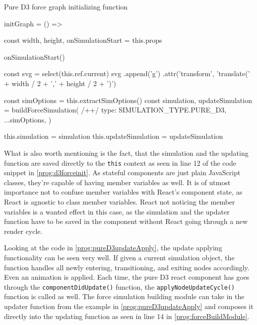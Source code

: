 \begin{program}[H]
\caption{Pure D3 force graph initializing function}
\label{prog:pureD3InitFn}
\begin{JsCode}
initGraph = () => {
  const { width, height, onSimulationStart } = this.props

  onSimulationStart()

  const svg = select(this.ref.current)
  svg
    .append('g')
    .attr('transform', 'translate(' + width / 2 + ',' + height / 2 + ')')

  const simOptions = this.extractSimOptions()
  const { simulation, updateSimulation } = buildForceSimulation({ /+\label{line:buildForceSimulation}+/
    type: SIMULATION_TYPE.PURE_D3,
    ...simOptions,
  })

  this.simulation = simulation
  this.updateSimulation = updateSimulation
}
\end{JsCode}
\end{program}

What is also worth mentioning is the fact, that the simulation and the updating function are saved directly to the \texttt{this} context as seen in line 12 of the code snippet in \ref{prog:d3forceinit}. As stateful components are just plain JavaScript classes, they're capable of having member variables as well. It is of utmost importance not to confuse member variables with React's component state, as React is agnostic to class member variables. React not noticing the member variables is a wanted effect in this case, as the simulation and the updater function have to be saved in the component without React going through a new render cycle. 

Looking at the code in \ref{prog:pureD3updateApply}, the update applying functionality can be seen very well. If given a current simulation object, the function handles all newly entering, transitioning, and exiting nodes accordingly. Even an animation is applied. Each time, the pure D3 react component has goes through the \texttt{componentDidUpdate()} function, the \texttt{applyNodeUpdateCycle()} function is called as well. The force simulation building module can take in the updater function from the example in \ref{prog:pureD3updateApply} and composes it directly into the updating function as seen in line 14 in \ref{prog:forceBuildModule}.

